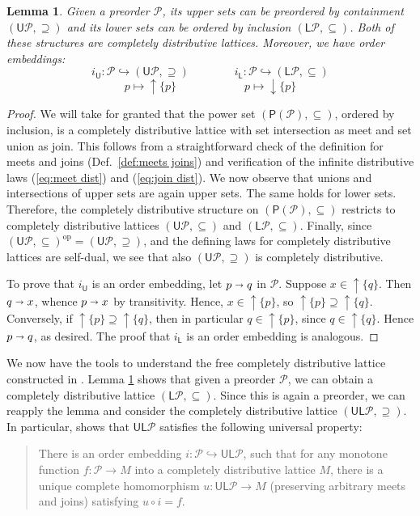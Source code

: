 \documentclass[12pt]{article}
\theoremstyle{definition}
\theoremstyle{plain}
\newtheorem{lemma}[definition]{Lemma}
\theoremstyle{plain}
\theoremstyle{plain}
\theoremstyle{plain}
\theoremstyle{remark}
\theoremstyle{remark}
\newcommand{\mc}[1]{\mathcal{#1}}
\newcommand{\sub}{\subseteq}
\newcommand{\low}{\mathsf{L}}
\newcommand{\upper}{\mathsf{U}}
\newcommand{\upc}[1]{{\uparrow #1}}
\newcommand{\lwc}[1]{{\downarrow #1}}
\begin{document}
\begin{lemma}\label{lem:upper lower lattice}
	Given a preorder $\mc{P}$, its upper sets can be preordered by containment $(\upper\mc{P}, \supseteq)$ and its lower sets can be ordered by inclusion $(\low\mc{P}, \sub)$. Both of these structures are completely distributive lattices. Moreover, we have order embeddings: 
	$$i_\mathsf{U}: \mc{P} \hookrightarrow (\upper\mc{P}, \supseteq) \qquad \qquad i_\mathsf{L}: \mc{P} \hookrightarrow (\low\mc{P}, \sub)$$
	$$ p \mapsto \upc{\{p\}} \qquad \qquad \qquad p \mapsto \lwc{\{p\}}$$
\end{lemma}
\begin{proof}
	We will take for granted that the power set $(\mathsf{P}(\mc{P}),\sub)$, ordered by inclusion, is a completely distributive lattice with set intersection as meet and set union as join. This follows from a straightforward check of the definition for meets and joins (Def.~\ref{def:meets joins}) and verification of the infinite distributive laws (\ref{eq:meet dist}) and (\ref{eq:join dist}). We now observe that unions and intersections of upper sets are again upper sets. The same holds for lower sets. Therefore, the completely distributive structure on $(\mathsf{P}(\mc{P}),\sub)$ restricts to completely distributive lattices $(\upper\mc{P}, \sub)$ and $(\low\mc{P}, \sub)$. Finally, since $(\upper\mc{P}, \sub)^\text{op} = (\upper\mc{P}, \supseteq)$, and the defining laws for completely distributive lattices are self-dual, we see that also $(\upper\mc{P}, \supseteq)$ is completely distributive.
	
	To prove that $i_\mathsf{U}$ is an order embedding, let $p \shortrightarrow q$ in $\mc{P}$. Suppose $x \in \upc{\{q\}}$. Then $q \shortrightarrow x$, whence $p \shortrightarrow x$ by transitivity. Hence, $x \in \upc{\{p\}}$, so $\upc{\{p\}} \supseteq \upc{\{q\}}$. Conversely, if $\upc{\{p\}} \supseteq \upc{\{q\}}$, then in particular $q \in \upc{\{p\}}$, since $q \in \upc{\{q\}}$. Hence $p \shortrightarrow q$, as desired. The proof that $i_\mathsf{L}$ is an order embedding is analogous.
\end{proof}

We now have the tools to understand the free completely distributive lattice constructed in \cite{Morris2004}. Lemma \ref{lem:upper lower lattice} shows that given a preorder $\mc{P}$, we can obtain a completely distributive lattice $(\low\mc{P}, \sub)$. Since this is again a preorder, we can reapply the lemma and consider the completely distributive lattice $(\upper\low\mc{P}, \supseteq)$. In particular, \cite{Morris2004} shows that $\upper\low\mc{P}$ satisfies the following universal property:
\begin{quote}
	There is an order embedding $i: \mc{P} \hookrightarrow \upper\low\mc{P}$, such that for any monotone function $f: \mc{P} \rightarrow M$ into a completely distributive lattice $M$, there is a unique complete homomorphism \mbox{$u: \upper\low\mc{P} \rightarrow M$} (preserving arbitrary meets and joins) satisfying $u \circ i = f$.
\end{quote}
\end{document}
